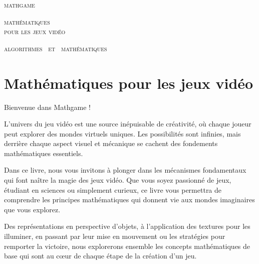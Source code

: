 
\pagestyle{empty}\thispagestyle{empty}
\vspace*{\fill}
\vspace*{5ex}
\begin{center}
	\fontsize{40}{40}\selectfont
	\textsc{mathgame}
	
	\vspace*{1ex}
	\textsc{\fontsize{24}{24}\selectfont 
	mathématiques  \\[-1.5ex]
	pour les jeux vidéo
	}
	
	\vspace*{2ex}
	
	\Large

\end{center}
\vfill
\begin{center}
	\Large
	\textsc{algorithmes \  et \  mathématiques}
\end{center}
\begin{center}
\end{center}

\clearpage

\thispagestyle{empty}


\vspace*{\fill}
\section*{Mathématiques pour les jeux vidéo}



Bienvenue dans \og{}Mathgame\fg{} !

\medskip

L'univers du jeu vidéo est une source inépuisable de créativité, où chaque joueur peut explorer des mondes virtuels uniques. Les possibilités sont infinies, mais derrière chaque aspect visuel et mécanique se cachent des fondements mathématiques essentiels.

\medskip

Dans ce livre, nous vous invitons à plonger dans les mécanismes fondamentaux qui font naître la magie des jeux vidéo. Que vous soyez passionné de jeux, étudiant en sciences ou simplement curieux, ce livre vous permettra de comprendre les principes mathématiques qui donnent vie aux mondes imaginaires que vous explorez.

\medskip

Des représentations en perspective d'objets, à l'application des textures pour les illuminer, en passant par leur mise en mouvement ou les stratégies pour remporter la victoire, nous explorerons ensemble les concepts mathématiques de base qui sont au cœur de chaque étape de la création d'un jeu.

